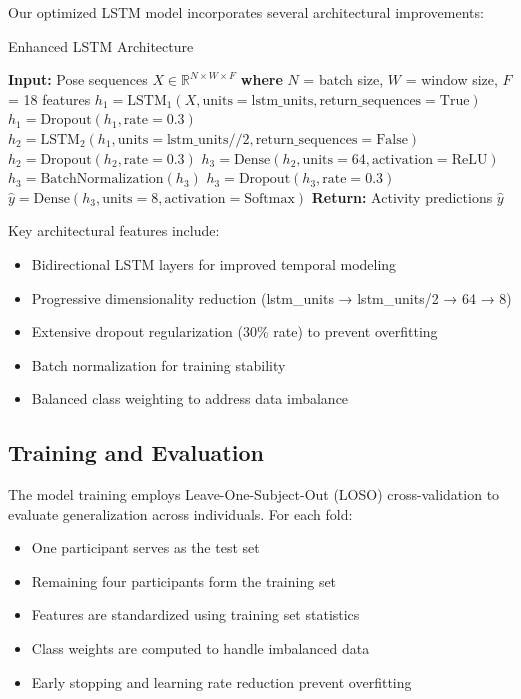 \documentclass[a4paper,11pt]{article}
\begin{document}
Our optimized LSTM model incorporates several architectural improvements:

\begin{algorithm}[H]
\caption{Enhanced LSTM Architecture}
\begin{algorithmic}[1]
\STATE \textbf{Input:} Pose sequences $X \in \mathbb{R}^{N \times W \times F}$
\STATE \textbf{where} $N$ = batch size, $W$ = window size, $F$ = 18 features
\STATE 
\STATE $h_1 = \text{LSTM}_1(X, \text{units}=\text{lstm\_units}, \text{return\_sequences}=\text{True})$
\STATE $h_1 = \text{Dropout}(h_1, \text{rate}=0.3)$
\STATE 
\STATE $h_2 = \text{LSTM}_2(h_1, \text{units}=\text{lstm\_units}//2, \text{return\_sequences}=\text{False})$
\STATE $h_2 = \text{Dropout}(h_2, \text{rate}=0.3)$
\STATE 
\STATE $h_3 = \text{Dense}(h_2, \text{units}=64, \text{activation}=\text{ReLU})$
\STATE $h_3 = \text{BatchNormalization}(h_3)$
\STATE $h_3 = \text{Dropout}(h_3, \text{rate}=0.3)$
\STATE 
\STATE $\hat{y} = \text{Dense}(h_3, \text{units}=8, \text{activation}=\text{Softmax})$
\STATE \textbf{Return:} Activity predictions $\hat{y}$
\end{algorithmic}
\end{algorithm}

Key architectural features include:
\begin{itemize}
\item Bidirectional LSTM layers for improved temporal modeling
\item Progressive dimensionality reduction (lstm\_units → lstm\_units/2 → 64 → 8)
\item Extensive dropout regularization (30\% rate) to prevent overfitting
\item Batch normalization for training stability
\item Balanced class weighting to address data imbalance
\end{itemize}

\subsection{Training and Evaluation}

The model training employs Leave-One-Subject-Out (LOSO) cross-validation to evaluate generalization across individuals. For each fold:

\begin{itemize}
\item One participant serves as the test set
\item Remaining four participants form the training set
\item Features are standardized using training set statistics
\item Class weights are computed to handle imbalanced data
\item Early stopping and learning rate reduction prevent overfitting
\end{itemize}
\end{document}
